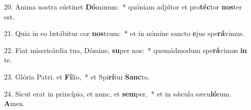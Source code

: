 20. Anima nostra sústinet \textbf{Dó}minum:~*  quóniam adjútor et pro\textbf{téc}tor \textbf{nos}ter est.\

21. Quia in eo lætábitur cor \textbf{nos}trum:~*  et in nómine sancto \textbf{e}jus spe\textbf{rá}vimus.\

22. Fiat misericórdia tua, Dómine, \textbf{su}per nos:~*  quemádmodum spe\textbf{rá}vimus \textbf{in} te.\

23. Glória Patri, et \textbf{Fí}lio,~*  et Spi\textbf{rí}tui \textbf{Sanc}to.\

24. Sicut erat in princípio, et nunc, et \textbf{sem}per,~*  et in sǽcula sæcu\textbf{ló}rum. \textbf{A}men.\

